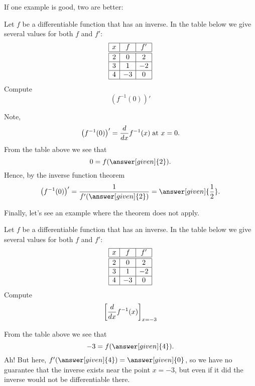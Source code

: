 \documentclass{ximera}
\begin{document}
If one example is good, two are better:

\begin{example}
  Let $f$ be a differentiable function that has an inverse. In the
  table below we give several values for both $f$ and $f'$:
  \[
  \begin{array}{|c|c|c|}\hline
    x & f  & f' \\ \hline \hline
    2 & 0  & 2  \\ \hline
    3 & 1  & -2 \\ \hline
    4 & -3 & 0  \\ \hline
  \end{array}
  \]
  Compute
  \[
  \left(f^{-1}(0)\right)'
  \]
  \begin{explanation}
    Note,
    \[
    \left(f^{-1}(0)\right)' = \frac{d}{dx} f^{-1}(x)\;\text{at $x=0$.}
    \]
    From the table above we see that
    \[
    0 = f(\answer[given]{2}).
    \]
    Hence, by the inverse function theorem
    \[
    \left(f^{-1}(0)\right)' = \frac{1}{f'(\answer[given]{2})} = \answer[given]{\frac{1}{2}}.
    \]
  \end{explanation}
\end{example}

Finally, let's see an example where the theorem does not apply.

\begin{example}
  Let $f$ be a differentiable function that has an inverse. In the
  table below we give several values for both $f$ and $f'$:
  \[
  \begin{array}{|c|c|c|}\hline
    x & f  & f' \\ \hline \hline
    2 & 0  & 2  \\ \hline
    3 & 1  & -2 \\ \hline
    4 & -3 & 0  \\ \hline
  \end{array}
  \]
  Compute
  \[
  \bigg[ \frac{d}{dx} f^{-1}(x) \bigg]_{x=-3}
  \]
  \begin{explanation}
    From the table above we see that
    \[
    -3 = f(\answer[given]{4}).
    \]
    Ah! But here, $f'(\answer[given]{4}) = \answer[given]{0}$, so we have no guarantee that the
    inverse exists near the point $x=-3$, but even if it did the inverse would not be differentiable there.
      \end{explanation}
\end{example}
\end{document}

